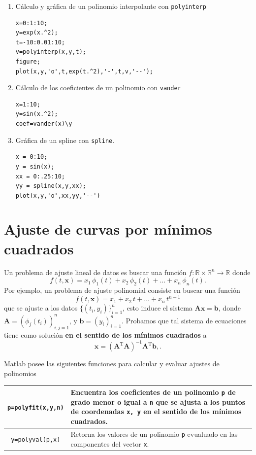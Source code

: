 \documentclass[letterpaper,11pt]{article}
\begin{document}
\begin{multicols}{2}
\begin{enumerate}
\item C\'alculo y gr\'afica de un polinomio interpolante con \texttt{polyinterp}
\begin{verbatim}
x=0:1:10;
y=exp(x.^2);
t=-10:0.01:10;
v=polyinterp(x,y,t);
figure;
plot(x,y,'o',t,exp(t.^2),'-',t,v,'--');
\end{verbatim}

\item C\'alculo de los coeficientes de un polinomio con \texttt{vander}
\begin{verbatim}
x=1:10;
y=sin(x.^2);
coef=vander(x)\y
\end{verbatim}

\item Gr\'afica de un spline con \texttt{spline}.
\begin{verbatim}
x = 0:10;
y = sin(x);
xx = 0:.25:10;
yy = spline(x,y,xx);
plot(x,y,'o',xx,yy,'--')
\end{verbatim}
\end{enumerate}
\end{multicols}


\section{Ajuste de curvas por m\'inimos cuadrados}

Un problema de ajuste lineal de datos es buscar una funci\'on $f:\mathbb{R}\times\mathbb{R}^n \rightarrow \mathbb{R}$ donde 
$$
f(t, \mathbf{x}) = x_1 \, \phi_1(t) + x_2 \, \phi_2(t) + \dots + x_n \, \phi_n(t).
$$
Por ejemplo, un problema de ajuste polinomial consiste en buscar una funci\'on
$$
f(t, \mathbf{x}) =x_1 + x_2 \, t + \dots + x_n \, t^{n-1} 
$$
que se ajuste a los datos $\{(t_i,y_i)\}_{i=1}^n$, esto induce el sistema  $\mathbf{A} \mathbf{x} = \mathbf{b}$, donde $\mathbf{A} = (\phi_j(t_i))_{i,j=1}^n$, y $\mathbf{b} = (y_i)_{i=1}^n$. Probamos que tal sistema de ecuaciones tiene como soluci\'on \textbf{en el sentido de los m\'inimos cuadrados} a
$$
\mathbf{x} = (\mathbf{A}^\mathrm{T} \mathbf{A})^{-1} \mathbf{A}^\mathrm{T} \mathbf{b},.
$$

Matlab posee las siguientes funciones para calcular y evaluar ajustes de polinomios
\begin{longtable}{||c|p{}||}
\hline
\texttt{p=polyfit(x,y,n)} 
	& Encuentra los coeficientes de un polinomio \texttt{p} de grado menor o igual a \texttt{n} que se ajusta a los puntos de coordenadas \texttt{x, y} en el sentido de los m\'inimos cuadrados.
\\
\hline
\texttt{y=polyval(p,x)} 
	& Retorna los valores de un polinomio \texttt{p} evualuado en las componentes del vector \texttt{x}.\\
\hline
\end{longtable}
\end{document}
